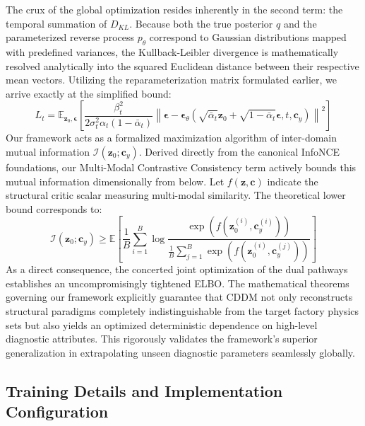 The crux of the global optimization resides inherently in the second term: the temporal summation of $D_{KL}$. Because both the true posterior $q$ and the parameterized reverse process $p_\theta$ correspond to Gaussian distributions mapped with predefined variances, the Kullback-Leibler divergence is mathematically resolved analytically into the squared Euclidean distance between their respective mean vectors. Utilizing the reparameterization matrix formulated earlier, we arrive exactly at the simplified bound:
\begin{equation}
L_t = \mathbb{E}_{\mathbf{z}_0, \boldsymbol{\epsilon}} \left[ \frac{\beta_t^2}{2\sigma_t^2 \alpha_t (1-\bar{\alpha}_t)} \left\| \boldsymbol{\epsilon} - \boldsymbol{\epsilon}_{\theta}\left(\sqrt{\bar{\alpha}_t}\mathbf{z}_0 + \sqrt{1-\bar{\alpha}_t}\boldsymbol{\epsilon}, t, \mathbf{c}_y\right) \right\|^2 \right]
\end{equation}
Our framework acts as a formalized maximization algorithm of inter-domain mutual information $\mathcal{I}(\mathbf{z}_0; \mathbf{c}_y)$. Derived directly from the canonical InfoNCE foundations, our Multi-Modal Contrastive Consistency term actively bounds this mutual information dimensionally from below. Let $f(\mathbf{z}, \mathbf{c})$ indicate the structural critic scalar measuring multi-modal similarity. The theoretical lower bound corresponds to:
\begin{equation}
\mathcal{I}(\mathbf{z}_0; \mathbf{c}_y) \geq \mathbb{E} \left[ \frac{1}{B} \sum_{i=1}^B \log \frac{\exp(f(\mathbf{z}_{0}^{(i)}, \mathbf{c}_{y}^{(i)}))}{\frac{1}{B}\sum_{j=1}^B \exp(f(\mathbf{z}_{0}^{(i)}, \mathbf{c}_{y}^{(j)}))} \right]
\end{equation}
As a direct consequence, the concerted joint optimization of the dual pathways establishes an uncompromisingly tightened ELBO. The mathematical theorems governing our framework explicitly guarantee that CDDM not only reconstructs structural paradigms completely indistinguishable from the target factory physics sets but also yields an optimized deterministic dependence on high-level diagnostic attributes. This rigorously validates the framework's superior generalization in extrapolating unseen diagnostic parameters seamlessly globally.


\subsection{Training Details and Implementation Configuration}
\label{subsec:training_details}

